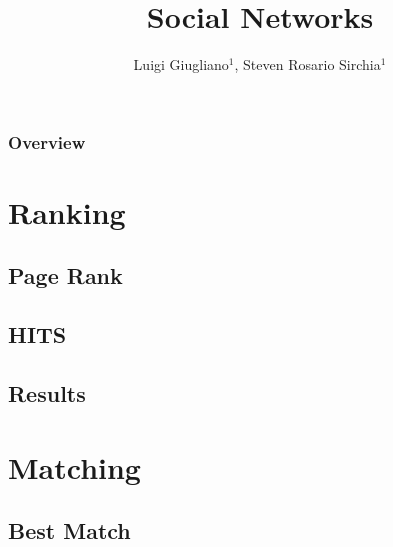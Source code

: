 \documentclass{beamer}
\title{Social Networks}
\author{Luigi Giugliano$^1$, Steven Rosario Sirchia$^1$}
\institute{$^1$Università degli studi di Salerno}
\begin{document}
\begin{frame}
   \maketitle
\end{frame}

\begin{frame}
  \frametitle{Overview}
  \footnotesize \tableofcontents
\end{frame}


\section{Ranking}
\subsection{Page Rank}
\begin{frame}

\end{frame}

\subsection{HITS}
\begin{frame}

\end{frame}

\subsection{Results}
\begin{frame}

\end{frame}

\section{Matching}
\subsection{Best Match}
\begin{frame}

\end{frame}
\end{document}
